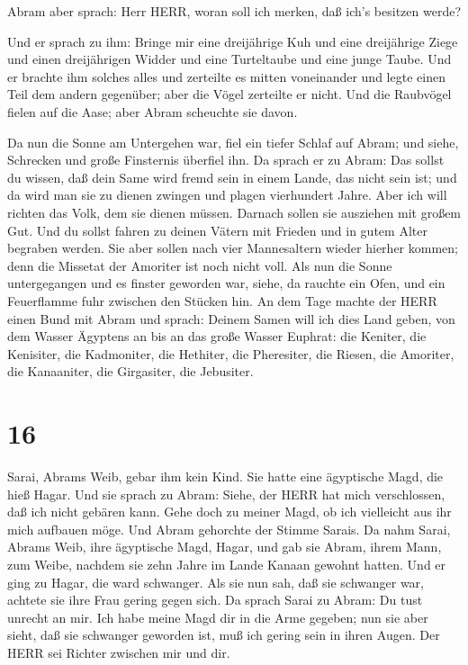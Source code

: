  Abram aber sprach: Herr HERR, woran soll ich merken, daß
ich's besitzen werde?

 Und er sprach zu ihm: Bringe mir eine dreijährige Kuh und
eine dreijährige Ziege und einen dreijährigen Widder und eine
Turteltaube und eine junge Taube.  Und er brachte ihm
solches alles und zerteilte es mitten voneinander und legte einen Teil
dem andern gegenüber; aber die Vögel zerteilte er nicht. 
Und die Raubvögel fielen auf die Aase; aber Abram scheuchte sie davon.

 Da nun die Sonne am Untergehen war, fiel ein tiefer Schlaf
auf Abram; und siehe, Schrecken und große Finsternis überfiel ihn.
 Da sprach er zu Abram: Das sollst du wissen, daß dein Same
wird fremd sein in einem Lande, das nicht sein ist; und da wird man sie
zu dienen zwingen und plagen vierhundert Jahre.  Aber ich
will richten das Volk, dem sie dienen müssen. Darnach sollen sie
ausziehen mit großem Gut.  Und du sollst fahren zu deinen
Vätern mit Frieden und in gutem Alter begraben werden.  Sie
aber sollen nach vier Mannesaltern wieder hierher kommen; denn die
Missetat der Amoriter ist noch nicht voll.  Als nun die
Sonne untergegangen und es finster geworden war, siehe, da rauchte ein
Ofen, und ein Feuerflamme fuhr zwischen den Stücken hin. 
An dem Tage machte der HERR einen Bund mit Abram und sprach: Deinem
Samen will ich dies Land geben, von dem Wasser Ägyptens an bis an das
große Wasser Euphrat:  die Keniter, die Kenisiter, die
Kadmoniter,  die Hethiter, die Pheresiter, die Riesen,
 die Amoriter, die Kanaaniter, die Girgasiter, die
Jebusiter.

\hypertarget{section-15}{%
\section{16}\label{section-15}}

 Sarai, Abrams Weib, gebar ihm kein Kind. Sie hatte eine
ägyptische Magd, die hieß Hagar.  Und sie sprach zu Abram:
Siehe, der HERR hat mich verschlossen, daß ich nicht gebären kann. Gehe
doch zu meiner Magd, ob ich vielleicht aus ihr mich aufbauen möge. Und
Abram gehorchte der Stimme Sarais.  Da nahm Sarai, Abrams
Weib, ihre ägyptische Magd, Hagar, und gab sie Abram, ihrem Mann, zum
Weibe, nachdem sie zehn Jahre im Lande Kanaan gewohnt hatten.
 Und er ging zu Hagar, die ward schwanger. Als sie nun sah,
daß sie schwanger war, achtete sie ihre Frau gering gegen sich.
 Da sprach Sarai zu Abram: Du tust unrecht an mir. Ich habe
meine Magd dir in die Arme gegeben; nun sie aber sieht, daß sie
schwanger geworden ist, muß ich gering sein in ihren Augen. Der HERR sei
Richter zwischen mir und dir.

